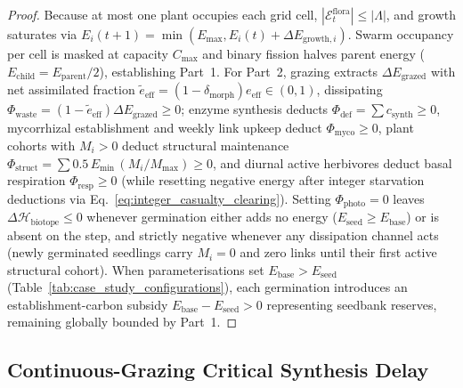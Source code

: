 \begin{proof}
Because at most one plant occupies each grid cell, $|\mathcal{E}_t^{\mathrm{flora}}| \le |\Lambda|$, and growth saturates via $E_i(t+1) = \min(E_{\max}, E_i(t) + \Delta E_{\mathrm{growth},i})$. Swarm occupancy per cell is masked at capacity $C_{\max}$ and binary fission halves parent energy ($E_{\mathrm{child}} = E_{\mathrm{parent}}/2$), establishing Part~1. For Part~2, grazing extracts $\Delta E_{\mathrm{grazed}}$ with net assimilated fraction $\tilde{e}_{\mathrm{eff}} = (1 - \delta_{\mathrm{morph}}) e_{\mathrm{eff}} \in (0, 1)$, dissipating $\Phi_{\mathrm{waste}} = (1 - \tilde{e}_{\mathrm{eff}})\Delta E_{\mathrm{grazed}} \ge 0$; enzyme synthesis deducts $\Phi_{\mathrm{def}} = \sum c_{\mathrm{synth}} \ge 0$, mycorrhizal establishment and weekly link upkeep deduct $\Phi_{\mathrm{myco}} \ge 0$, plant cohorts with $M_i > 0$ deduct structural maintenance $\Phi_{\mathrm{struct}} = \sum 0.5\,E_{\min}\,(M_i / M_{\max}) \ge 0$, and diurnal active herbivores deduct basal respiration $\Phi_{\mathrm{resp}} \ge 0$ (while resetting negative energy after integer starvation deductions via Eq.~\eqref{eq:integer_casualty_clearing}). Setting $\Phi_{\mathrm{photo}} = 0$ leaves $\Delta \mathcal{H}_{\mathrm{biotope}} \le 0$ whenever germination either adds no energy ($E_{\mathrm{seed}} \ge E_{\mathrm{base}}$) or is absent on the step, and strictly negative whenever any dissipation channel acts (newly germinated seedlings carry $M_i = 0$ and zero links until their first active structural cohort). When parameterisations set $E_{\mathrm{base}} > E_{\mathrm{seed}}$ (Table~\ref{tab:case_study_configurations}), each germination introduces an establishment-carbon subsidy $E_{\mathrm{base}} - E_{\mathrm{seed}} > 0$ representing seedbank reserves, remaining globally bounded by Part~1.
\end{proof}

\subsection{Continuous-Grazing Critical Synthesis Delay}
\label{subsec:critical_synthesis_delay}

